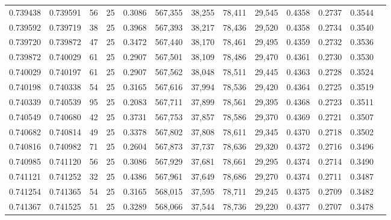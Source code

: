 \begin{tabular}{rrrrrrrrrrrrr}
0.739438 & 0.739591 &    56 &  25 &                                     0.3086 & 567,355 &  38,255 &  78,411 &  29,545 & 0.4358 & 0.2737 & 0.3544 \\
0.739592 & 0.739719 &    38 &  25 &                                     0.3968 & 567,393 &  38,217 &  78,436 &  29,520 & 0.4358 & 0.2734 & 0.3540 \\
0.739720 & 0.739872 &    47 &  25 &                                     0.3472 & 567,440 &  38,170 &  78,461 &  29,495 & 0.4359 & 0.2732 & 0.3536 \\
0.739872 & 0.740029 &    61 &  25 &                                     0.2907 & 567,501 &  38,109 &  78,486 &  29,470 & 0.4361 & 0.2730 & 0.3530 \\
0.740029 & 0.740197 &    61 &  25 &                                     0.2907 & 567,562 &  38,048 &  78,511 &  29,445 & 0.4363 & 0.2728 & 0.3524 \\
0.740198 & 0.740338 &    54 &  25 &                                     0.3165 & 567,616 &  37,994 &  78,536 &  29,420 & 0.4364 & 0.2725 & 0.3519 \\
0.740339 & 0.740539 &    95 &  25 &                                     0.2083 & 567,711 &  37,899 &  78,561 &  29,395 & 0.4368 & 0.2723 & 0.3511 \\
0.740549 & 0.740680 &    42 &  25 &                                     0.3731 & 567,753 &  37,857 &  78,586 &  29,370 & 0.4369 & 0.2721 & 0.3507 \\
0.740682 & 0.740814 &    49 &  25 &                                     0.3378 & 567,802 &  37,808 &  78,611 &  29,345 & 0.4370 & 0.2718 & 0.3502 \\
0.740816 & 0.740982 &    71 &  25 &                                     0.2604 & 567,873 &  37,737 &  78,636 &  29,320 & 0.4372 & 0.2716 & 0.3496 \\
0.740985 & 0.741120 &    56 &  25 &                                     0.3086 & 567,929 &  37,681 &  78,661 &  29,295 & 0.4374 & 0.2714 & 0.3490 \\
0.741121 & 0.741252 &    32 &  25 &                                     0.4386 & 567,961 &  37,649 &  78,686 &  29,270 & 0.4374 & 0.2711 & 0.3487 \\
0.741254 & 0.741365 &    54 &  25 &                                     0.3165 & 568,015 &  37,595 &  78,711 &  29,245 & 0.4375 & 0.2709 & 0.3482 \\
0.741367 & 0.741525 &    51 &  25 &                                     0.3289 & 568,066 &  37,544 &  78,736 &  29,220 & 0.4377 & 0.2707 & 0.3478 \\

\end{tabular}
